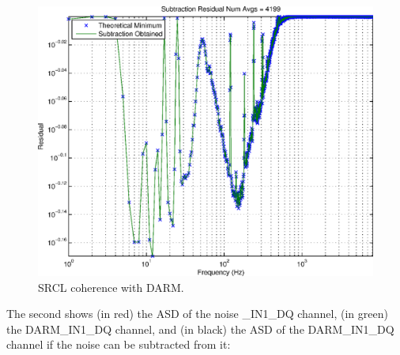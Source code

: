 \begin{figure}
\begin{center}
\includegraphics[width=0.4\paperwidth,height=0.3\paperheight]{SubtractionEstimate-SRCL.eps}
\caption{
SRCL coherence with DARM.
}
\end{center}
\end{figure}

The second shows (in red) the ASD of the noise \_IN1\_DQ channel, (in green) the DARM\_IN1\_DQ channel, and (in black) the ASD of the DARM\_IN1\_DQ channel if the noise can be subtracted from it:

